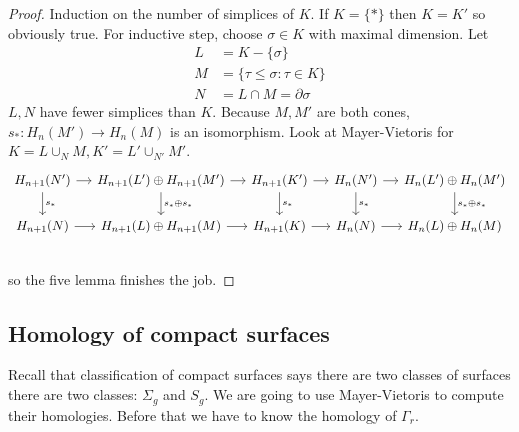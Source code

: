 \documentclass[a4paper]{article}
\renewcommand{\b}{\partial} %
\begin{document}
\begin{proof}
  Induction on the number of simplices of \(K\). If \(K = \{*\}\) then \(K = K'\) so obviously true. For inductive step, choose \(\sigma \in K\) with maximal dimension. Let
  \begin{align*}
    L &= K - \{\sigma\} \\
    M &= \{\tau \leq \sigma: \tau \in K\} \\
    N &= L \cap M = \b \sigma
  \end{align*}
  \(L, N\) have fewer simplices than \(K\). Because \(M, M'\) are both cones, \(s_*: H_n(M') \to H_n(M)\) is an isomorphism. Look at Mayer-Vietoris for \(K = L \cup_N M, K' = L' \cup_{N'} M'\).
  \[
    \begin{tikzcd}[column sep=small]
      H_{n + 1}(N') \ar[r] \ar[d, "s_*"] & H_{n + 1}(L') \oplus H_{n + 1}(M') \ar[r] \ar[d, "s_* \oplus s_*"] & H_{n + 1}(K') \ar[r] \ar[d, "s_*"] & H_n(N') \ar[r] \ar[d, "s_*"] & H_n(L') \oplus H_n(M') \ar[d, "s_* \oplus s_*"] \\
      H_{n + 1}(N) \ar[r] & H_{n + 1}(L) \oplus H_{n + 1}(M) \ar[r] & H_{n + 1}(K) \ar[r] & H_n(N) \ar[r] & H_n(L) \oplus H_n(M) \\
    \end{tikzcd}
  \]
  so the five lemma finishes the job.
\end{proof}

\subsection{Homology of compact surfaces}

Recall that classification of compact surfaces says there are two classes of surfaces there are two classes: \(\Sigma_g\) and \(S_g\). We are going to use Mayer-Vietoris to compute their homologies. Before that we have to know the homology of \(\Gamma_r\).
\end{document}
